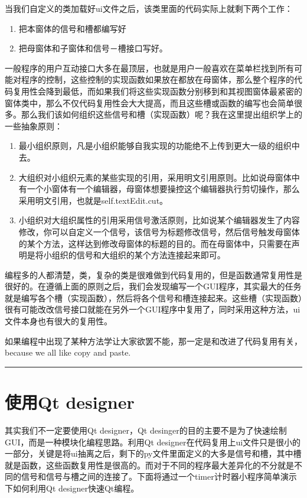 \documentclass[11pt,oneside]{article}
\begin{document}
当我们自定义的类加载好ui文件之后，该类里面的代码实际上就剩下两个工作：
\begin{enumerate}
\item 把本窗体的信号和槽都编写好
\item 把母窗体和子窗体和信号－槽接口写好。
\end{enumerate}

一般程序的用户互动接口大多在最顶层，也就是用户一般喜欢在菜单栏找到所有可能对程序的控制，这些控制的实现函数如果放在都放在母窗体，那么整个程序的代码复用性会降到最低，而如果我们将这些实现函数分别移到和其视图窗体最紧密的窗体类中，那么不仅代码复用性会大大提高，而且这些槽或函数的编写也会简单很多。那么我们该如何组织这些信号和槽（实现函数）呢？我在这里提出组织学上的一些抽象原则：
\begin{enumerate}
\item 最小组织原则，凡是小组织能够自我实现的功能绝不上传到更大一级的组织中去。
\item 大组织对小组织元素的某些实现的引用，采用明文引用原则。比如说母窗体中有一个小窗体有一个编辑器，母窗体想要操控这个编辑器执行剪切操作，那么采用明文引用，也就是self.textEdit.cut。
\item 小组织对大组织属性的引用采用信号激活原则，比如说某个编辑器发生了内容修改，你可以自定义一个信号，该信号为标题修改信号，然后信号触发母窗体的某个方法，这样达到修改母窗体的标题的目的。而在母窗体中，只需要在声明是将小组织的信号和大组织的某个方法连接起来即可。
\end{enumerate}


编程多的人都清楚，类，复杂的类是很难做到代码复用的，但是函数通常复用性是很好的。在遵循上面的原则之后，我们会发现编写一个GUI程序，其实最大的任务就是编写各个槽（实现函数），然后将各个信号和槽连接起来。这些槽（实现函数）很有可能改改信号接口就能在另外一个GUI程序中复用了，同时采用这种方法，ui文件本身也有很大的复用性。

如果编程中出现了某种方法学让大家欲罢不能，那一定是和改进了代码复用有关，because we all like copy and paste. 


\rule{\linewidth}{0.5pt}
\section{使用Qt designer}
\label{sec:orgheadline23}
其实我们不一定要使用Qt designer，Qt desinger的目的主要不是为了快速绘制GUI，而是一种模块化编程思路。利用Qt designer在代码复用上ui文件只是很小的一部分，关键是将ui抽离之后，剩下的py文件里面定义的大多是信号和槽，其中槽就是函数，这些函数复用性是很高的。而对于不同的程序最大差异化的不分就是不同的信号和信号与槽之间的连接了。下面将通过一个timer计时器小程序简单演示下如何利用Qt designer快速Qt编程。
\end{document}
